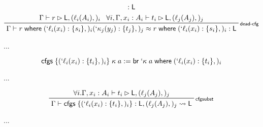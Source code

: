 \documentclass[acmsmall,screen,review]{acmart}
\newcommand{\ms}[1]{\ensuremath{\mathsf{#1}}}
\newcommand{\lbl}[1]{{`#1}}
\newcommand{\lto}{:}
\newcommand{\brb}[2]{\ms{br}\;#1\;#2}
\newcommand{\lbrb}[2]{\brb{\lbl{#1}}{#2}}
\newcommand{\where}[2]{#1\;\ms{where}\;#2}
\newcommand{\wbranch}[3]{#1(#2) \lto \{#3\}}
\newcommand{\lwbranch}[3]{\wbranch{\lbl{#1}}{#2}{#3}}
\newcommand{\cfgsubst}[1]{\ms{cfgs}\;\{#1\}}
\newcommand{\bhyp}[2]{#1 : #2}
\newcommand{\lhyp}[2]{#1(#2)}
\newcommand{\rle}[1]{{\scriptsize\textsf{#1}}}
\newcommand{\haslb}[3]{#1 \vdash #2 \rhd #3}
\newcommand{\lbsubst}[4]{#1 \vdash #2: #3 \rightsquigarrow #4}
\newcommand{\teqv}{\approx}
\newcommand{\lbeq}[4]{#1 \vdash #2 \teqv #3 : {#4}}
\begin{document}
\begin{gather*}
{{          : \ms{L}}
      }
    \\
    \prftree[r]{\rle{dead-cfg}}
      {\haslb{\Gamma}{r}{\ms{L}, (\lhyp{\ell_i}{A_i},)_i}}
      {\forall i, \haslb{\Gamma, \bhyp{x_i}{A_i}}{t_i}{\ms{L}, (\lhyp{\ell_j}{A_j},)_j}}
      {\lbeq{\Gamma}{\where{r}{
          (\lwbranch{\ell_i}{x_i}{s_i},)_i
          (\lwbranch{\kappa_j}{y_j}{t_j},)_j}}
        {\where{r}{(\lwbranch{\ell_i}{x_i}{s_i},)_i}}{\ms{L}}}
\end{gather*}

...

\begin{equation*}
  \cfgsubst{(\lwbranch{\ell_i}{x_i}{t_i},)_i}\;\kappa\;a
  := \where{\lbrb{\kappa}{a}}{(\lwbranch{\ell_i}{x_i}{t_i},)_i}
\end{equation*}

...

\begin{equation*}
  \prftree[r]{\rle{cfgsubst}}
    {\forall i. \haslb{\Gamma, \bhyp{x_i}{A_i}}{t_i}{\ms{L}, (\lhyp{\ell_j}{A_j},)_j}}
    {\lbsubst{\Gamma}
      {\cfgsubst{(\lwbranch{\ell_i}{x_i}{t_i},)_i}}{\ms{L}, (\lhyp{\ell_j}{A_j},)_j}{\ms{L}}}
\end{equation*}

...
\end{document}
